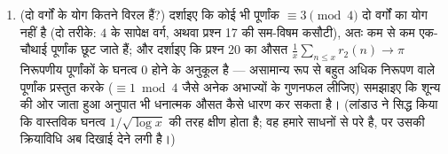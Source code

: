 \begin{problem}[{सप्ताहांत समस्या --- दो वर्गों के योग, $\Z[\iu]$ के
माध्यम से}]
\begin{enumerate}[resume]
        मिलाइए:
        \[
        \sum_{d \leq x}\chi(d)\Bigl\lfloor\frac
        xd\Bigr\rfloor = \frac{\pi x}4 + O(\sqrt x),
        \]
        और --- पूर्णांक भागों को सावधानी से हटाकर --- लाइब्नित्स
        की श्रेणी निकालिए
        \[
        1 - \frac13 + \frac15 - \frac17 + \dots = \frac\pi4 .
        \]
        विषम व्युत्क्रमों की एकांतर श्रेणी \emph{वस्तुतः} भाजकों
        $\equiv 1$ का भाजकों $\equiv 3$ पर औसत आधिक्य है: विश्लेषण, जिसे
        अंकगणित ने परिकलित किया।
  \item (दो वर्गों के योग कितने विरल हैं?) दर्शाइए कि कोई भी
        पूर्णांक $\equiv 3 \pmod 4$ दो वर्गों का योग नहीं है (दो तरीके:
        $4$ के सापेक्ष वर्ग, अथवा प्रश्न 17 की सम-विषम कसौटी),
        अतः कम से कम एक-चौथाई पूर्णांक छूट जाते हैं; और दर्शाइए
        कि प्रश्न 20 का औसत $\frac1x\sum_{n\leq
        x}r_2(n) \to \pi$ निरूपणीय पूर्णांकों के घनत्व
        $0$ होने के अनुकूल है --- असामान्य रूप से बहुत अधिक
        निरूपण वाले पूर्णांक प्रस्तुत करके ($\equiv 1 \bmod 4$ जैसे अनेक
        अभाज्यों के गुणनफल लीजिए) समझाइए कि शून्य की ओर जाता हुआ
        अनुपात भी धनात्मक औसत कैसे धारण कर सकता है। (लांडाउ ने
        सिद्ध किया कि वास्तविक घनत्व $1/\sqrt{\log x}$ की तरह क्षीण होता है;
        वह हमारे साधनों से परे है, पर उसकी क्रियाविधि अब दिखाई
        देने लगी है।)
\end{enumerate}


\end{problem}
